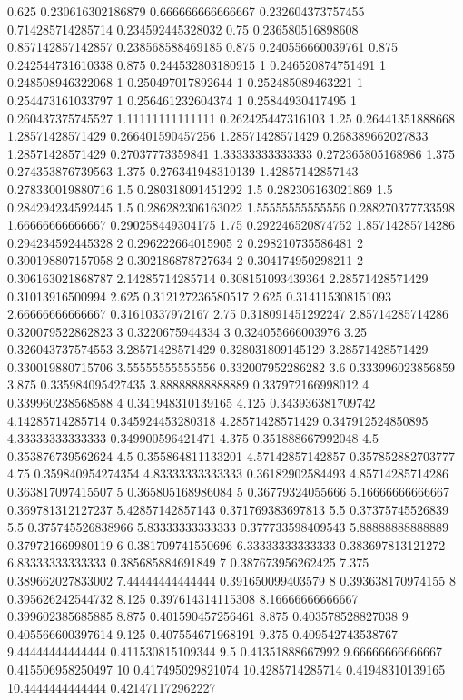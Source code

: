 {0.625 0.230616302186879
0.666666666666667 0.232604373757455
0.714285714285714 0.234592445328032
0.75 0.236580516898608
0.857142857142857 0.238568588469185
0.875 0.240556660039761
0.875 0.242544731610338
0.875 0.244532803180915
1 0.246520874751491
1 0.248508946322068
1 0.250497017892644
1 0.252485089463221
1 0.254473161033797
1 0.256461232604374
1 0.25844930417495
1 0.260437375745527
1.11111111111111 0.262425447316103
1.25 0.26441351888668
1.28571428571429 0.266401590457256
1.28571428571429 0.268389662027833
1.28571428571429 0.27037773359841
1.33333333333333 0.272365805168986
1.375 0.274353876739563
1.375 0.276341948310139
1.42857142857143 0.278330019880716
1.5 0.280318091451292
1.5 0.282306163021869
1.5 0.284294234592445
1.5 0.286282306163022
1.55555555555556 0.288270377733598
1.66666666666667 0.290258449304175
1.75 0.292246520874752
1.85714285714286 0.294234592445328
2 0.296222664015905
2 0.298210735586481
2 0.300198807157058
2 0.302186878727634
2 0.304174950298211
2 0.306163021868787
2.14285714285714 0.308151093439364
2.28571428571429 0.31013916500994
2.625 0.312127236580517
2.625 0.314115308151093
2.66666666666667 0.31610337972167
2.75 0.318091451292247
2.85714285714286 0.320079522862823
3 0.3220675944334
3 0.324055666003976
3.25 0.326043737574553
3.28571428571429 0.328031809145129
3.28571428571429 0.330019880715706
3.55555555555556 0.332007952286282
3.6 0.333996023856859
3.875 0.335984095427435
3.88888888888889 0.337972166998012
4 0.339960238568588
4 0.341948310139165
4.125 0.343936381709742
4.14285714285714 0.345924453280318
4.28571428571429 0.347912524850895
4.33333333333333 0.349900596421471
4.375 0.351888667992048
4.5 0.353876739562624
4.5 0.355864811133201
4.57142857142857 0.357852882703777
4.75 0.359840954274354
4.83333333333333 0.36182902584493
4.85714285714286 0.363817097415507
5 0.365805168986084
5 0.36779324055666
5.16666666666667 0.369781312127237
5.42857142857143 0.371769383697813
5.5 0.37375745526839
5.5 0.375745526838966
5.83333333333333 0.377733598409543
5.88888888888889 0.379721669980119
6 0.381709741550696
6.33333333333333 0.383697813121272
6.83333333333333 0.385685884691849
7 0.387673956262425
7.375 0.389662027833002
7.44444444444444 0.391650099403579
8 0.393638170974155
8 0.395626242544732
8.125 0.397614314115308
8.16666666666667 0.399602385685885
8.875 0.401590457256461
8.875 0.403578528827038
9 0.405566600397614
9.125 0.407554671968191
9.375 0.409542743538767
9.44444444444444 0.411530815109344
9.5 0.41351888667992
9.66666666666667 0.415506958250497
10 0.417495029821074
10.4285714285714 0.41948310139165
10.4444444444444 0.421471172962227
}
